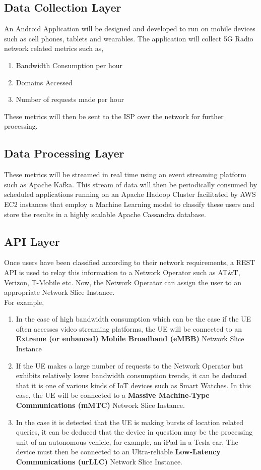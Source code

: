 \documentclass[conference]{IEEEtran}
\begin{document}
\subsection{Data Collection Layer}\label{AA}
An Android Application will be designed and developed to run on mobile devices such as cell phones, tablets and wearables. The application will collect 5G Radio network related metrics such as,
\begin{enumerate}
\item Bandwidth Consumption per hour
\item Domains Accessed
\item Number of requests made per hour
\end{enumerate}

These metrics will then be sent to the ISP over the network for further processing.

\subsection{Data Processing Layer}
These metrics will be streamed in real time using an event streaming platform such as Apache Kafka. This stream of data will then be periodically consumed by scheduled applications running on an Apache Hadoop Cluster facilitated by AWS EC2 instances that employ a Machine Learning model to classify these users and store the results in a highly scalable Apache Cassandra database.

\subsection{API Layer}
Once users have been classified according to their network requirements, a REST API is used to relay this information to a Network Operator such as AT\&T, Verizon, T-Mobile etc. Now, the Network Operator can assign the user to an appropriate Network Slice Instance.
\\
For example,
\begin{enumerate}
\item In the case of high bandwidth consumption which can be the case if the UE often accesses video streaming platforms, the UE will be connected to an \textbf{Extreme (or enhanced) Mobile Broadband (eMBB)} Network Slice Instance
\item If the UE makes a large number of requests to the Network Operator but exhibits relatively lower bandwidth consumption trends, it can be deduced that it is one of various kinds of IoT devices such as Smart Watches. In this case, the UE will be connected to a \textbf{Massive Machine-Type Communications (mMTC)} Network Slice Instance.
\item In the case it is detected that the UE is making bursts of location related queries, it can be deduced that the device in question may be the processing unit of an autonomous vehicle, for example, an iPad in a Tesla car. The device must then be connected to an Ultra-reliable \textbf{Low-Latency Communications (urLLC)} Network Slice Instance.
\end{enumerate}
\end{document}
